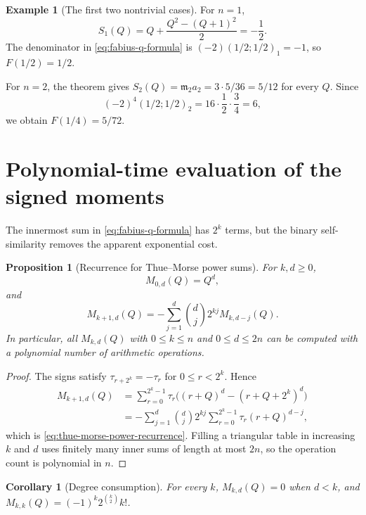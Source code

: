 \documentclass[11pt,oneside,openany]{book}
\newtheorem{proposition}[theorem]{Proposition}
\newtheorem{corollary}[theorem]{Corollary}
\theoremstyle{definition}
\newtheorem{example}[theorem]{Example}
\theoremstyle{remark}
\begin{document}
\begin{example}[The first two nontrivial cases]\label{ex:fabius-q-small}
For $n=1$,
\[
 S_1(Q)=Q+\frac{Q^2-(Q+1)^2}{2}=-\frac12.
\]
The denominator in \eqref{eq:fabius-q-formula} is
$(-2)(1/2;1/2)_1=-1$, so $F(1/2)=1/2$.

For $n=2$, the theorem gives $S_2(Q)=\mathfrak m_2a_2=3\cdot5/36=5/12$ for every $Q$.  Since
\[
 (-2)^4(1/2;1/2)_2=16\cdot\frac12\cdot\frac34=6,
\]
we obtain $F(1/4)=5/72$.
\end{example}

\section{Polynomial-time evaluation of the signed moments}

The innermost sum in \eqref{eq:fabius-q-formula} has $2^k$ terms, but the binary self-similarity removes the apparent exponential cost.

\begin{proposition}[Recurrence for Thue--Morse power sums]\label{prop:thue-morse-power-recurrence}
For $k,d\ge0$,
\begin{equation}
 M_{0,d}(Q)=Q^d,\label{eq:thue-morse-power-base}
\end{equation}
and
\begin{equation}
 M_{k+1,d}(Q)
 =-\sum_{j=1}^d\binom dj2^{kj}M_{k,d-j}(Q).\label{eq:thue-morse-power-recurrence}
\end{equation}
In particular, all $M_{k,d}(Q)$ with $0\le k\le n$ and $0\le d\le2n$ can be computed with a polynomial number of arithmetic operations.
\end{proposition}

\begin{proof}
The signs satisfy $\tau_{r+2^k}=-\tau_r$ for $0\le r<2^k$.  Hence
\begin{align*}
 M_{k+1,d}(Q)
 &=\sum_{r=0}^{2^k-1}\tau_r
 \bigl((r+Q)^d-(r+Q+2^k)^d\bigr)\\
 &=-\sum_{j=1}^d\binom dj2^{kj}
 \sum_{r=0}^{2^k-1}\tau_r(r+Q)^{d-j},
\end{align*}
which is \eqref{eq:thue-morse-power-recurrence}.  Filling a triangular table in increasing $k$ and $d$ uses finitely many inner sums of length at most $2n$, so the operation count is polynomial in $n$.
\end{proof}

\begin{corollary}[Degree consumption]
For every $k$, $M_{k,d}(Q)=0$ when $d<k$, and $M_{k,k}(Q)=(-1)^k2^{\binom k2}k!$.
\end{corollary}
\end{document}
